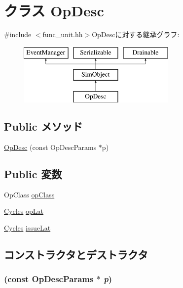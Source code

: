 \hypertarget{classOpDesc}{
\section{クラス OpDesc}
\label{classOpDesc}
}


{\ttfamily \#include $<$func\_\-unit.hh$>$}OpDescに対する継承グラフ:\begin{figure}[H]
\begin{center}
\leavevmode
\includegraphics[height=3cm]{classOpDesc}
\end{center}
\end{figure}
\subsection*{Public メソッド}
\begin{DoxyCompactItemize}
\item 
\hyperlink{classOpDesc_ae65296b31fb2e04eafcd535a99855cba}{OpDesc} (const OpDescParams $\ast$p)
\end{DoxyCompactItemize}
\subsection*{Public 変数}
\begin{DoxyCompactItemize}
\item 
OpClass \hyperlink{classOpDesc_a164f0a00140939320887fa6a85757541}{opClass}
\item 
\hyperlink{classCycles}{Cycles} \hyperlink{classOpDesc_a91d8272e62b680a821b9dda36fdebea9}{opLat}
\item 
\hyperlink{classCycles}{Cycles} \hyperlink{classOpDesc_a92d0f4d2dc537df17136cc8e77d566b4}{issueLat}
\end{DoxyCompactItemize}


\subsection{コンストラクタとデストラクタ}
\hypertarget{classOpDesc_ae65296b31fb2e04eafcd535a99855cba}{
\subsubsection[{OpDesc}]{ (const OpDescParams $\ast$ {\em p})}}
\label{classOpDesc_ae65296b31fb2e04eafcd535a99855cba}



